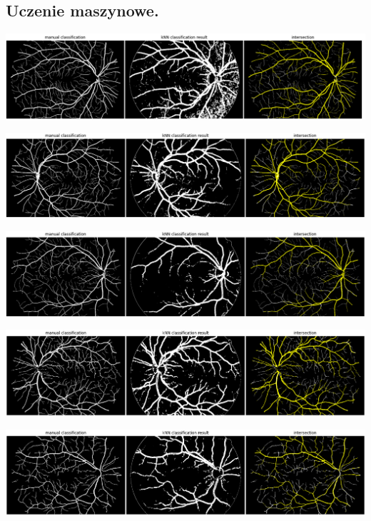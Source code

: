 \documentclass[a4paper, 11pt]{article}
\begin{document}
\subsection{Uczenie maszynowe.}

\begin{center}
	\includegraphics[width=\textwidth]{./ML/01_h.png}
	
	\includegraphics[width=\textwidth]{./ML/04_h.png}
	
	\includegraphics[width=\textwidth]{./ML/09_h.png}
	
	\includegraphics[width=\textwidth]{./ML/12_h.png}
	
	\includegraphics[width=\textwidth]{./ML/15_h.png}
	
\end{center}
\end{document}
